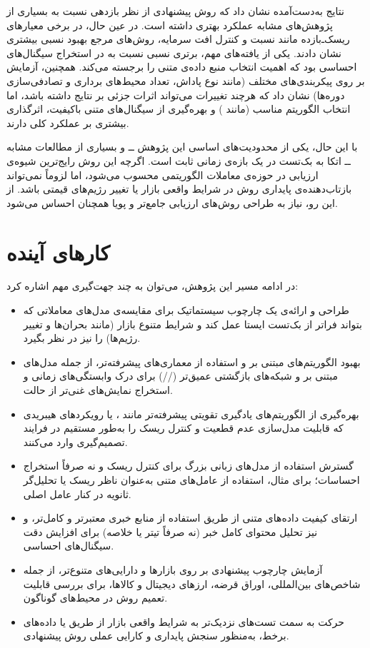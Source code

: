 \documentclass[12pt, a4paper]{report}
\begin{document}
نتایج به‌دست‌آمده نشان داد که روش پیشنهادی از نظر بازدهی نسبت به بسیاری از پژوهش‌های مشابه عملکرد بهتری داشته است. 
در عین حال، در برخی معیارهای ریسک‌ـ‌بازده مانند نسبت  و کنترل افت سرمایه، روش‌های مرجع بهبود نسبی بیشتری نشان دادند. 
یکی از یافته‌های مهم، برتری نسبی  نسبت به  در استخراج سیگنال‌های احساسی بود که اهمیت انتخاب منبع داده‌ی متنی را برجسته می‌کند. 
همچنین، آزمایش بر روی پیکربندی‌های مختلف (مانند نوع پاداش، تعداد محیط‌های برداری و تصادفی‌سازی دوره‌ها) نشان داد که هرچند تغییرات می‌تواند اثرات جزئی بر نتایج داشته باشد، اما انتخاب الگوریتم مناسب (مانند ) و بهره‌گیری از سیگنال‌های متنی باکیفیت، اثرگذاری بیشتری بر عملکرد کلی دارند.  

با این حال، یکی از محدودیت‌های اساسی این پژوهش ــ و بسیاری از مطالعات مشابه ــ اتکا به بک‌تست در یک بازه‌ی زمانی ثابت است. 
اگرچه این روش رایج‌ترین شیوه‌ی ارزیابی در حوزه‌ی معاملات الگوریتمی محسوب می‌شود، اما لزوماً نمی‌تواند بازتاب‌دهنده‌ی پایداری روش در شرایط واقعی بازار یا تغییر رژیم‌های قیمتی باشد. 
از این رو، نیاز به طراحی روش‌های ارزیابی جامع‌تر و پویا همچنان احساس می‌شود.  

\section*{کارهای آینده}

در ادامه مسیر این پژوهش، می‌توان به چند جهت‌گیری مهم اشاره کرد:  
\begin{itemize}
    \item طراحی و ارائه‌ی یک چارچوب سیستماتیک برای مقایسه‌ی مدل‌های معاملاتی که بتواند فراتر از بک‌تست ایستا عمل کند و شرایط متنوع بازار (مانند بحران‌ها و تغییر رژیم‌ها) را نیز در نظر بگیرد.  
    \item بهبود الگوریتم‌های مبتنی بر  و استفاده از معماری‌های پیشرفته‌تر، از جمله مدل‌های مبتنی بر  و شبکه‌های بازگشتی عمیق‌تر (//) برای درک وابستگی‌های زمانی و استخراج نمایش‌های غنی‌تر از حالت.  
    \item بهره‌گیری از الگوریتم‌های یادگیری تقویتی پیشرفته‌تر مانند ،  یا رویکردهای هیبریدی که قابلیت مدل‌سازی عدم قطعیت و کنترل ریسک را به‌طور مستقیم در فرایند تصمیم‌گیری وارد می‌کنند.  
    \item گسترش استفاده از مدل‌های زبانی بزرگ برای کنترل ریسک و نه صرفاً استخراج احساسات؛ برای مثال، استفاده از عامل‌های متنی به‌عنوان ناظر ریسک یا تحلیل‌گر ثانویه در کنار عامل اصلی.  
    \item ارتقای کیفیت داده‌های متنی از طریق استفاده از منابع خبری معتبرتر و کامل‌تر، و نیز تحلیل محتوای کامل خبر (نه صرفاً تیتر یا خلاصه) برای افزایش دقت سیگنال‌های احساسی.  
    \item آزمایش چارچوب پیشنهادی بر روی بازارها و دارایی‌های متنوع‌تر، از جمله شاخص‌های بین‌المللی، اوراق قرضه، ارزهای دیجیتال و کالاها، برای بررسی قابلیت تعمیم روش در محیط‌های گوناگون.  
    \item حرکت به سمت تست‌های نزدیک‌تر به شرایط واقعی بازار از طریق  یا داده‌های برخط، به‌منظور سنجش پایداری و کارایی عملی روش پیشنهادی.  
\end{itemize}
\end{document}
